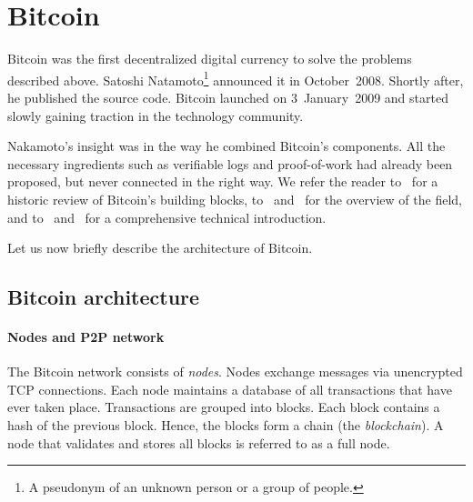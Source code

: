 \section{Bitcoin}

Bitcoin was the first decentralized digital currency to solve the problems described above.
Satoshi Natamoto\footnote{A pseudonym of an unknown person or a group of people.} announced it in October~2008.
Shortly after, he published the source code.
Bitcoin launched on 3~January~2009 and started slowly gaining traction in the technology community.

Nakamoto's insight was in the way he combined Bitcoin's components.
All the necessary ingredients such as verifiable logs and proof-of-work had already been proposed, but never connected in the right way.
We refer the reader to~\cite{Narayanan2017} for a historic review of Bitcoin's building blocks, to~\cite{Bonneau2015} and~\cite{Tschorsch2016} for the overview of the field, and to~\cite{Narayanan2016} and~\cite{Antonopoulos2014} for a comprehensive technical introduction.


Let us now briefly describe the architecture of Bitcoin.

\subsection{Bitcoin architecture}

\paragraph{Nodes and P2P network}

The Bitcoin network consists of \textit{nodes}.
Nodes exchange messages via unencrypted TCP connections.
Each node maintains a database of all transactions that have ever taken place.
Transactions are grouped into blocks.
Each block contains a hash of the previous block.
Hence, the blocks form a chain (the \textit{blockchain}).
A node that validates and stores all blocks is referred to as a full node.



